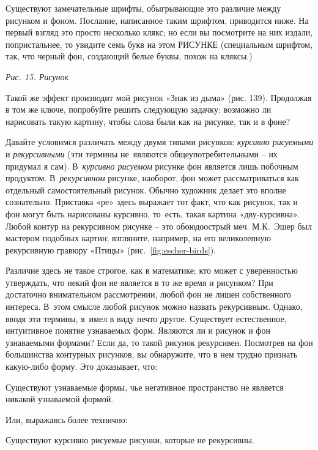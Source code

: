 \documentclass[../main.tex]{subfiles}
\begin{document}
Существуют замечательные шрифты, обыгрывающие это различие между рисунком и фоном. Послание, написанное таким шрифтом, приводится ниже. На первый взгляд это просто несколько клякс; но если вы посмотрите на них издали, попристальнее, то увидите семь букв на этом РИСУНКЕ (специальным шрифтом, так, что черный фон, создающий белые буквы, похож на кляксы.)

\emph{Рис. 15. Рисунок}

Такой же эффект производит мой рисунок «Знак из дыма» (рис. 139). Продолжая в том же ключе, попробуйте решить следующую задачку: возможно ли нарисовать такую картину, чтобы слова были как на рисунке, так и в фоне?

Давайте условимся различать между двумя типами рисунков: \emph{курсивно рисуемыми} и \emph{рекурсивными} (эти термины не~являются общеупотребительными \--- их придумал я сам). В~\emph{курсивно рисуемом} рисунке фон является лишь побочным продуктом. В~\emph{рекурсивном} рисунке, наоборот, фон может рассматриваться как отдельный самостоятельный рисунок. Обычно художник делает это вполне сознательно. Приставка «ре» здесь выражает тот факт, что как рисунок, так и фон могут быть нарисованы курсивно, то~есть, такая картина «дву-курсивна». Любой контур на рекурсивном рисунке \--- это обоюдоострый меч. М.К.~Эшер был мастером подобных картин; взгляните, например, на его великолепную рекурсивную гравюру «Птицы» (рис.~\ref{fig:escher-birds}).


Различие здесь не такое строгое, как в математике; кто может с уверенностью утверждать, что некий фон не является в то же время и рисунком? При достаточно внимательном рассмотрении, любой фон не лишен собственного интереса. В~этом смысле любой рисунок можно назвать рекурсивным. Однако, вводя эти термины, я~имел в виду нечто другое. Существует естественное, интуитивное понятие узнаваемых форм. Являются ли и рисунок и фон узнаваемыми формами? Если да, то такой рисунок рекурсивен. Посмотрев на фон большинства контурных рисунков, вы обнаружите, что в нем трудно признать какую-либо форму. Это доказывает, что:
%
\begin{block}
    Существуют узнаваемые формы, чье негативное пространство не является никакой узнаваемой формой.
\end{block}
%
Или, выражаясь более технично:
%
\begin{block}
    Существуют курсивно рисуемые рисунки, которые не рекурсивны.
\end{block}
\end{document}
